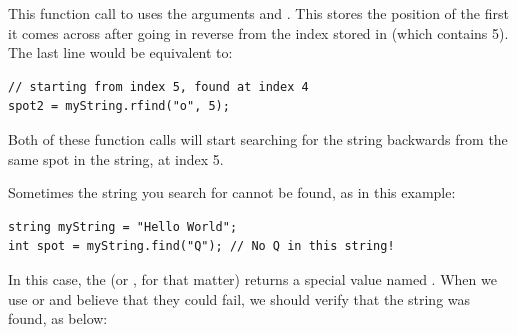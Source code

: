\noindent This function call to  uses the arguments  and .
This stores the position of the first  it comes across after going in reverse from the index stored in  (which contains 5).
The last line would be equivalent to:

\noindent\begin{minipage}{\linewidth}\begin{lstlisting}
// starting from index 5, found at index 4
spot2 = myString.rfind("o", 5); 
\end{lstlisting}\end{minipage}

\noindent Both of these function calls will start searching for the string  backwards from the same spot in the string, at index 5. 

Sometimes the string you search for cannot be found, as in this example:

\noindent\begin{minipage}{\linewidth}\begin{lstlisting}
string myString = "Hello World";
int spot = myString.find("Q"); // No Q in this string!
\end{lstlisting}\end{minipage}

\noindent In this case, the  (or , for that matter) returns a special value named .
When we use  or  and believe that they could fail, we should verify that the string was found, as below:

